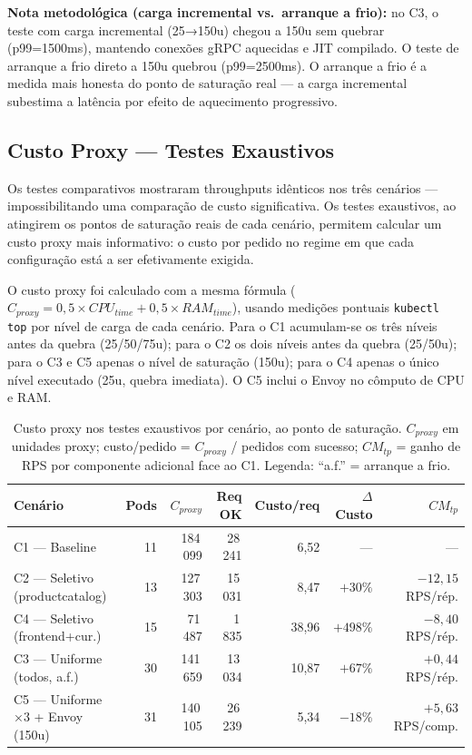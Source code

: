 \documentclass[acmsmall,screen=true,nonacm]{acmart}
\begin{document}
\textbf{Nota metodológica (carga incremental vs.\ arranque a frio):} no C3, o teste com carga incremental (25→150u) chegou a 150u sem quebrar (p99=1500ms), mantendo conexões gRPC aquecidas e JIT compilado. O teste de arranque a frio direto a 150u quebrou (p99=2500ms). O arranque a frio é a medida mais honesta do ponto de saturação real — a carga incremental subestima a latência por efeito de aquecimento progressivo.

\subsection{Custo Proxy — Testes Exaustivos}
\label{subsec:custo-exaustivo}

Os testes comparativos mostraram throughputs idênticos nos três cenários — impossibilitando uma comparação de custo significativa. Os testes exaustivos, ao atingirem os pontos de saturação reais de cada cenário, permitem calcular um custo proxy mais informativo: o custo por pedido no regime em que cada configuração está a ser efetivamente exigida.

O custo proxy foi calculado com a mesma fórmula ($C_{proxy} = 0{,}5 \times CPU_{time} + 0{,}5 \times RAM_{time}$), usando medições pontuais \texttt{kubectl top} por nível de carga de cada cenário. Para o C1 acumulam-se os três níveis antes da quebra (25/50/75u); para o C2 os dois níveis antes da quebra (25/50u); para o C3 e C5 apenas o nível de saturação (150u); para o C4 apenas o único nível executado (25u, quebra imediata). O C5 inclui o Envoy no cômputo de CPU e RAM.

\begin{table}[h]
\caption{Custo proxy nos testes exaustivos por cenário, ao ponto de saturação. $C_{proxy}$ em unidades proxy; custo/pedido = $C_{proxy}$ / pedidos com sucesso; $CM_{tp}$ = ganho de RPS por componente adicional face ao C1. Legenda: ``a.f.'' = arranque a frio.}
\label{tab:custo-exaustivo}
\begin{tabular}{lrrrrrr}
\toprule
\textbf{Cenário} & \textbf{Pods} & \textbf{$C_{proxy}$} & \textbf{Req OK} & \textbf{Custo/req} & \textbf{$\Delta$Custo} & \textbf{$CM_{tp}$} \\
\midrule
C1 — Baseline                    & 11 & 184\,099 & 28\,241 &  6{,}52 & —        & — \\
C2 — Seletivo (productcatalog)   & 13 & 127\,303 & 15\,031 &  8{,}47 & $+30\%$  & $-12{,}15$~RPS/rép. \\
C4 — Seletivo (frontend+cur.)    & 15 &  71\,487 &  1\,835 & 38{,}96 & $+498\%$ & $-8{,}40$~RPS/rép. \\
C3 — Uniforme (todos, a.f.)      & 30 & 141\,659 & 13\,034 & 10{,}87 & $+67\%$  & $+0{,}44$~RPS/rép. \\
C5 — Uniforme ×3 + Envoy (150u) & 31 & 140\,105 & 26\,239 &  5{,}34 & $-18\%$  & $+5{,}63$~RPS/comp. \\
\bottomrule
\end{tabular}
\end{table}
\end{document}

